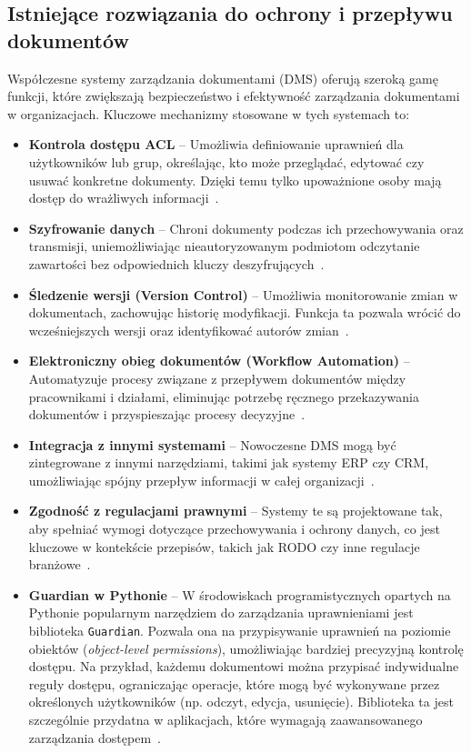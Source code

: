 \subsection{Istniejące rozwiązania do ochrony i przepływu dokumentów}

Współczesne systemy zarządzania dokumentami (DMS) oferują szeroką gamę funkcji, które zwiększają bezpieczeństwo i efektywność zarządzania dokumentami w organizacjach. Kluczowe mechanizmy stosowane w tych systemach to:

\begin{itemize}
	\item \textbf{Kontrola dostępu ACL} -- Umożliwia definiowanie uprawnień dla użytkowników lub grup, określając, kto może przeglądać, edytować czy usuwać konkretne dokumenty. Dzięki temu tylko upoważnione osoby mają dostęp do wrażliwych informacji~\cite{acl, acl_2}.
	
	\item \textbf{Szyfrowanie danych} -- Chroni dokumenty podczas ich przechowywania oraz transmisji, uniemożliwiając nieautoryzowanym podmiotom odczytanie zawartości bez odpowiednich kluczy deszyfrujących~\cite{szyrowanie_danych}.

	\item \textbf{Śledzenie wersji (Version Control)} -- Umożliwia monitorowanie zmian w dokumentach, zachowując historię modyfikacji. Funkcja ta pozwala wrócić do wcześniejszych wersji oraz identyfikować autorów zmian~\cite{kotntrola_wersji}. 
	
	\item \textbf{Elektroniczny obieg dokumentów (Workflow Automation)} -- Automatyzuje procesy związane z przepływem dokumentów między pracownikami i działami, eliminując potrzebę ręcznego przekazywania dokumentów i przyspieszając procesy decyzyjne~\cite{workflow_utomation}.

	\item \textbf{Integracja z innymi systemami} -- Nowoczesne DMS mogą być zintegrowane z innymi narzędziami, takimi jak systemy ERP czy CRM, umożliwiając spójny przepływ informacji w całej organizacji~\cite{dms}. 

	\item \textbf{Zgodność z regulacjami prawnymi} -- Systemy te są projektowane tak, aby spełniać wymogi dotyczące przechowywania i ochrony danych, co jest kluczowe w kontekście przepisów, takich jak RODO czy inne regulacje branżowe~\cite{rodo_dokumenty}.
	
	\item \textbf{Guardian w Pythonie} -- W środowiskach programistycznych opartych na Pythonie popularnym narzędziem do zarządzania uprawnieniami jest biblioteka \texttt{Guardian}. Pozwala ona na przypisywanie uprawnień na poziomie obiektów (\emph{object-level permissions}), umożliwiając bardziej precyzyjną kontrolę dostępu. Na przykład, każdemu dokumentowi można przypisać indywidualne reguły dostępu, ograniczając operacje, które mogą być wykonywane przez określonych użytkowników (np. odczyt, edycja, usunięcie). Biblioteka ta jest szczególnie przydatna w aplikacjach, które wymagają zaawansowanego zarządzania dostępem~\cite{django_guardian}.
\end{itemize}

